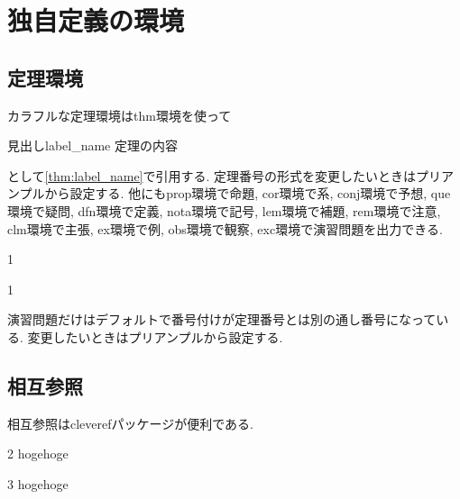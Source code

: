 \documentclass[11pt,a4paper,oneside,lualatex]{ltjsarticle} %
\numberwithin{equation}{section} %
\begin{document}
\section{独自定義の環境} \label{sec:environment}



\subsection{定理環境} \label{subsec:thm}


カラフルな定理環境はthm環境を使って
\begin{thm}{見出し}{label_name}
	定理の内容
\end{thm}
として\cref{thm:label_name}で引用する.
定理番号の形式を変更したいときはプリアンプルから設定する.
他にもprop環境で命題, cor環境で系, conj環境で予想, que環境で疑問, dfn環境で定義, nota環境で記号, lem環境で補題, rem環境で注意, clm環境で主張, ex環境で例, obs環境で観察, exc環境で演習問題を出力できる.
\begin{dfn}{}{1}
	
\end{dfn}
\begin{lem}{}{1}
	
\end{lem}
\begin{exc}{}{}
	演習問題だけはデフォルトで番号付けが定理番号とは別の通し番号になっている.
	変更したいときはプリアンプルから設定する.
\end{exc}


\subsection{相互参照} \label{subsec:ref}


相互参照はcleverefパッケージが便利である. 

\begin{thm}{}{2}
	hogehoge
\end{thm}

\begin{thm}{}{3}
	hogehoge
\end{thm}
\end{document}
